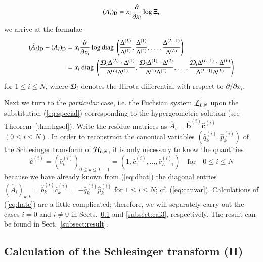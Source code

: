 \documentclass[12pt]{article}
\numberwithin{equation}{section}
\begin{document}
\[
(A_i)_{\rm D}=x_i \frac{\partial}{\partial x_i}
\log \Xi,
\]
we arrive at the formulae
\begin{align} 
(\hat{A}_i)_{\rm D}-
(A_i)_{\rm D}
&=
x_i 
\frac{\partial}{\partial x_i}
\log 
{\rm diag \ } \left(
\frac{ \Delta^{(L)} }{ \Delta^{(1)} },
\frac{ \Delta^{(1)} }{ \Delta^{(2)} },
\ldots,
\frac{ \Delta^{(L-1)} }{ \Delta^{(L)} }
\right)
\nonumber
\\
&=
x_i
\
{\rm diag \ } \left(
 \frac{{\cal D}_i  \Delta^{(L)}  \cdot \Delta^{(1)} }{ \Delta^{(L)}  \Delta^{(1)} },
\frac{{\cal D}_i  \Delta^{(1)}  \cdot \Delta^{(2)} }{ \Delta^{(1)}  \Delta^{(2)} },
  \ldots,
 \frac{{\cal D}_i  \Delta^{(L-1)}  \cdot \Delta^{(L)} }{ \Delta^{(L-1)}  \Delta^{(L)} }
\right)
\label{eq:dhat}
\end{align}
for $1 \leq i \leq N$, where ${\cal D}_i$ denotes the Hirota differential with respect to $\partial/\partial x_i$.



Next we turn to the {\it particular} case, i.e.
the Fuchsian system ${\cal L}_{L,N}$ upon
the substitution (\ref{eq:special})
corresponding to the hypergeometric solution
(see Theorem~\ref{thm:hgsol}).
Write 
the residue matrices 
as 
$\hat{A}_i= \hat{\boldsymbol b}^{(i)} \hat{{\boldsymbol  c}}^{(i)}$ $(0 \leq i\leq N)$.
In order to reconstruct the canonical variables 
$(\hat{q}_k^{(i)},\hat{p}_k^{(i)})$ of the Schlesinger transform
of ${\cal H}_{L,N}$, 
it is only necessary to
know the quantities 
\begin{equation}
\label{eq:hatc}
\hat{{\boldsymbol  c}}^{(i)}
=
\left( \hat{c}_k^{(i)} \right)_{0 \leq k \le L-1}
=
\left(1, \hat{c}_1^{(i)}, \ldots ,\hat{c}_{L-1}^{(i)}\right)
 \quad \text{for} \quad  0 \leq i \leq N
\end{equation}
because we have already known 
from (\ref{eq:dhat})
 the diagonal entries
$ (\hat{A}_i)_{k,k}  =\hat{b}_k^{(i)} \hat{c}_k^{(i)}= -\hat{q}_k^{(i)} \hat{p}_k^{(i)}$
for $1 \leq i \leq N$;
cf. (\ref{eq:canvar}).
Calculations of (\ref{eq:hatc}) are a little complicated;
therefore, we will separately carry out 
the cases
$i=0$ and $i \neq 0$ in Sects.~\ref{subsect:cal2} and \ref{subsect:cal3},
respectively.
The result can be found in Sect.~\ref{subsect:result}.



\subsection{Calculation of the Schlesinger transform (II)}
\label{subsect:cal2}
\end{document}
